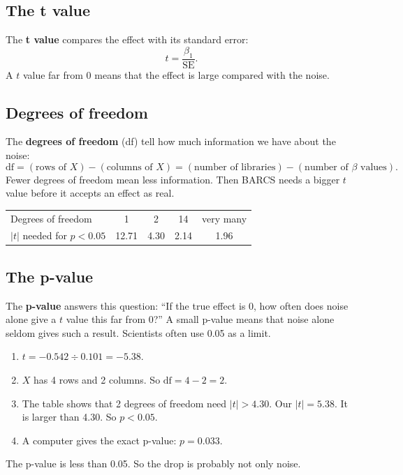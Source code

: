 \documentclass[12pt]{article}
\begin{document}
\subsection{The t value}

The \textbf{t value} compares the effect with its standard error:
\[
t = \frac{\beta_1}{\text{SE}}.
\]
A $t$ value far from 0 means that the effect is large compared with the
noise.

\subsection{Degrees of freedom}

The \textbf{degrees of freedom} (df) tell how much information we have
about the noise:
\[
\text{df} = (\text{rows of } X) - (\text{columns of } X)
 = (\text{number of libraries}) - (\text{number of } \beta \text{ values}).
\]
Fewer degrees of freedom mean less information. Then BARCS needs a bigger
$t$ value before it accepts an effect as real.

\begin{center}
\begin{tabular}{lcccc}
\toprule
Degrees of freedom & 1 & 2 & 14 & very many\\
$|t|$ needed for $p < 0.05$ & 12.71 & 4.30 & 2.14 & 1.96\\
\bottomrule
\end{tabular}
\end{center}

\subsection{The p-value}

The \textbf{p-value} answers this question: ``If the true effect is 0, how
often does noise alone give a $t$ value this far from 0?'' A small p-value
means that noise alone seldom gives such a result. Scientists often use 0.05
as a limit.

\begin{worked}
\begin{enumerate}[leftmargin=1.4em]
\item $t = -0.542 \div 0.101 = -5.38$.
\item $X$ has 4 rows and 2 columns. So $\text{df} = 4 - 2 = 2$.
\item The table shows that 2 degrees of freedom need $|t| > 4.30$. Our
  $|t| = 5.38$. It is larger than 4.30. So $p < 0.05$.
\item A computer gives the exact p-value: $p = 0.033$.
\end{enumerate}
The p-value is less than 0.05. So the drop is probably not only noise.
\end{worked}
\end{document}
